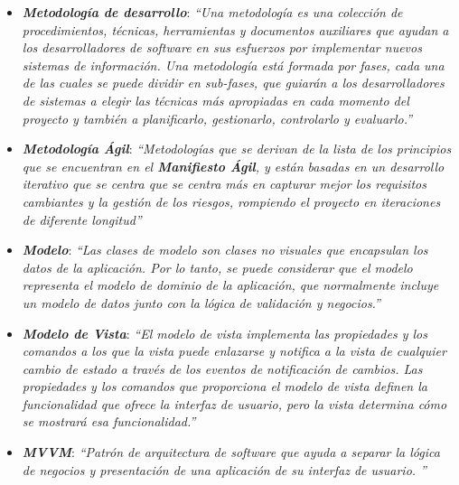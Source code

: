 \begin{itemize}
    \item \textbf{\textit{Metodología de desarrollo}}: \textit{“Una metodología es una colección de procedimientos, técnicas, 
    herramientas y documentos auxiliares que ayudan a los desarrolladores de software en sus esfuerzos por implementar nuevos 
    sistemas de información. Una metodología está formada por fases, cada una de las cuales se puede dividir en sub-fases, 
    que guiarán a los desarrolladores de sistemas a elegir las técnicas más apropiadas en cada momento del proyecto y también 
    a planificarlo, gestionarlo, controlarlo y evaluarlo.”} \autocite*{AmayaBalaguera2015}

    \item \textbf{\textit{Metodología Ágil}}: \textit{“Metodologías que se derivan de la lista de los principios que se encuentran 
    en el \textbf{Manifiesto Ágil}, y están basadas en un desarrollo iterativo que se centra que se centra más en capturar mejor 
    los requisitos cambiantes y la gestión de los riesgos, rompiendo el proyecto en iteraciones de diferente longitud”} \autocite*{AmayaBalaguera2015}
    
    \item \textbf{\textit{Modelo}}: \textit{“Las clases de modelo son clases no 
    visuales que encapsulan los datos de la aplicación. Por lo tanto, se 
    puede considerar que el modelo representa el modelo de dominio de la 
    aplicación, que normalmente incluye un modelo de datos junto con la 
    lógica de validación y negocios.”} \autocite*{MicrosoftMVVM}

    \item \textbf{\textit{Modelo de Vista}}: \textit{“El modelo de vista implementa las 
    propiedades y los comandos a los que la vista puede enlazarse y notifica 
    a la vista de cualquier cambio de estado a través de los eventos de 
    notificación de cambios. Las propiedades y los comandos que proporciona 
    el modelo de vista definen la funcionalidad que ofrece la interfaz de 
    usuario, pero la vista determina cómo se mostrará esa funcionalidad.”} \autocite*{MicrosoftMVVM}
    
    \item \textbf{\textit{MVVM}}: \textit{“Patrón de arquitectura de software que
    ayuda a separar la lógica de negocios y presentación de una aplicación 
    de su interfaz de usuario. ”} \autocite*{MicrosoftMVVM}


\end{itemize}

